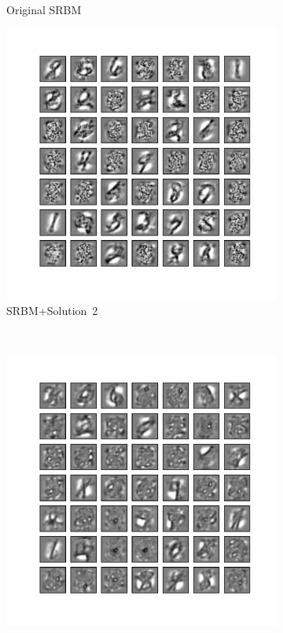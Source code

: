 \begin{figure}
\begin{subfigure}[t]{0.4\textwidth}
		\caption{Original SRBM}
	\end{subfigure}
	\begin{subfigure}[t]{0.4\textwidth}
		\includegraphics[width=\textwidth]{pics_sdlm/52_MNIST_SRBM_noise/2_60000_0.pdf}
		\caption{SRBM+Solution~2}
	\end{subfigure}	\\
	\begin{subfigure}[t]{0.4\textwidth}
		\includegraphics[width=\textwidth]{pics_sdlm/51_MNIST_SRBM_teach/2_60000_0.pdf}

\end{subfigure}
\end{figure}
